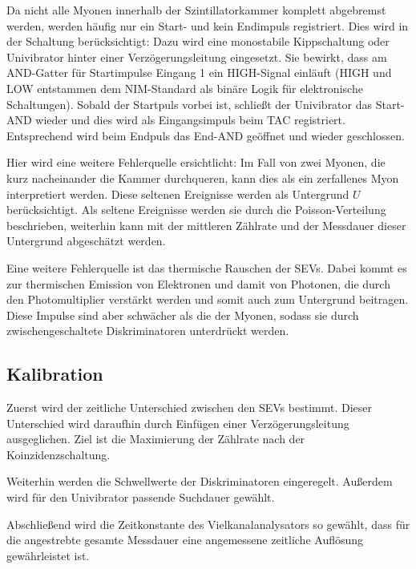 Da nicht alle Myonen innerhalb der Szintillatorkammer komplett abgebremst werden, werden h\"aufig nur ein Start- und kein Endimpuls registriert. Dies wird in der Schaltung ber\"ucksichtigt: Dazu wird eine monostabile Kippschaltung oder Univibrator hinter einer Verz\"ogerungsleitung eingesetzt. Sie bewirkt, dass am AND-Gatter f\"ur Startimpulse Eingang 1 ein HIGH-Signal einl\"auft (HIGH und LOW entstammen dem NIM-Standard als bin\"are Logik f\"ur elektronische Schaltungen). Sobald der Startpuls vorbei ist, schlie{\ss}t der Univibrator das Start-AND wieder und dies wird als Eingangsimpuls beim TAC registriert. Entsprechend wird beim Endpuls das End-AND ge\"offnet und wieder geschlossen.

Hier wird eine weitere Fehlerquelle ersichtlicht: Im Fall von zwei Myonen, die kurz nacheinander die Kammer durchqueren, kann dies als ein zerfallenes Myon interpretiert werden. Diese seltenen Ereignisse werden als Untergrund $U$ ber\"ucksichtigt. Als seltene Ereignisse werden sie durch die Poisson-Verteilung beschrieben, weiterhin kann mit der mittleren Z\"ahlrate und der Messdauer dieser Untergrund abgesch\"atzt werden.

Eine weitere Fehlerquelle ist das thermische Rauschen der SEVs. Dabei kommt es zur thermischen Emission von Elektronen und damit von Photonen, die durch den Photomultiplier verst\"arkt werden und somit auch zum Untergrund beitragen. Diese Impulse sind aber schw\"acher als die der Myonen, sodass sie durch zwischengeschaltete Diskriminatoren unterdr\"uckt werden.

\subsection{Kalibration}
Zuerst wird der zeitliche Unterschied zwischen den SEVs bestimmt. Dieser Unterschied wird daraufhin durch Einf\"ugen einer Verz\"ogerungsleitung ausgeglichen. Ziel ist die Maximierung der Z\"ahlrate nach der Koinzidenzschaltung.

Weiterhin werden die Schwellwerte der Diskriminatoren eingeregelt. Au{\ss}erdem wird f\"ur den Univibrator passende Suchdauer gew\"ahlt.

Abschlie{\ss}end wird die Zeitkonstante des Vielkanalanalysators so gew\"ahlt, dass f\"ur die angestrebte gesamte Messdauer eine angemessene zeitliche Aufl\"osung gew\"ahrleistet ist.



\label{sec:exec}

